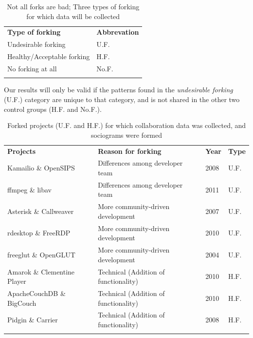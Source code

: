 \documentclass{acm_proc_article-sp}
\begin{document}
\begin{table}[!htbp]
\caption{Not all forks are bad; Three types of forking for which data will be collected}
\label{tableUndesirableForkingDataCollect} 
\begin{tabular}{p{} p{}}
\hline\noalign{\smallskip}
\textbf{Type of forking} & \textbf{Abbrevation} \\
\noalign{\smallskip}\hline\noalign{\smallskip}
Undesirable forking & U.F. \\ \hline
Healthy/Acceptable forking & H.F. \\\hline
No forking at all & No.F. \\
\noalign{\smallskip}\hline
\end{tabular}
\end{table}

Our results will only be valid if the patterns found in the \textit{undesirable forking} (U.F.) category are unique to that category, and is not shared in the other two control groups (H.F. and No.F.).

\begin{table}[!ht]
\centering
\caption{Forked projects (U.F. and H.F.) for which collaboration data was collected, and sociograms were formed}
\label{forkedProjectsDataCollected}
\begin{tabular}{p{} p{} p{} p{}}
\hline\noalign{\smallskip}
\textbf{Projects} & \textbf{Reason for forking} & \textbf{Year} & \textbf{Type}\\
\noalign{\smallskip}\hline\noalign{\smallskip}
Kamailio \& OpenSIPS & Differences among developer team & 2008 & U.F.\\ \hline
ffmpeg \& libav & Differences among developer team & 2011 & U.F.\\ \hline
Asterisk \& Callweaver & More community-driven development & 2007 & U.F.\\ \hline
rdesktop \& FreeRDP  & More community-driven development & 2010 & U.F.\\ \hline
freeglut \& OpenGLUT & More community-driven development & 2004 & U.F.\\ \hline
Amarok \& Clementine Player & Technical (Addition of functionality) & 2010 & H.F.\\ \hline
ApacheCouchDB \& BigCouch & Technical (Addition of functionality) & 2010 & H.F.\\ \hline
Pidgin \& Carrier & Technical (Addition of functionality) & 2008 & H.F.\\
\noalign{\smallskip}\hline
\end{tabular}
\end{table}
\end{document}

